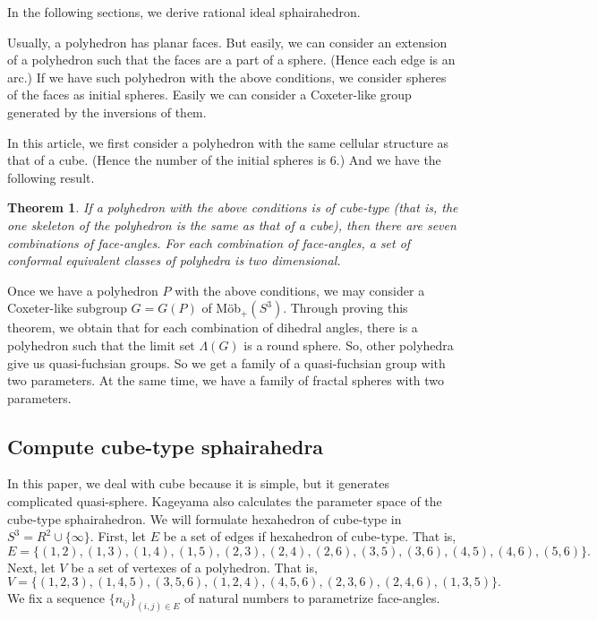 \documentclass[suppldata, dvipdfmx]{interact}
\theoremstyle{plain}%
\newtheorem{theorem}{Theorem}[section]
\theoremstyle{definition}
\theoremstyle{remark}
\theoremstyle{problemstyle}
\begin{document}
In the following sections, we derive rational ideal sphairahedron.

Usually, a polyhedron has planar faces. But easily, we can consider an
extension of a polyhedron such that the faces are a part of a
sphere. (Hence each edge is an arc.) If we have such polyhedron with
the above conditions, we consider spheres of the faces as initial
spheres. Easily we can consider a Coxeter-like group generated by the
inversions of them.

In this article, we first consider a polyhedron with the same cellular
structure as that of a cube. (Hence the number of the initial spheres is
6.) And we have the following result.

\begin{theorem}\label{main}
 If a polyhedron with the above conditions is of cube-type (that is,
 the one skeleton of the polyhedron is the same as that of a cube), then
 there are seven combinations of face-angles. For each combination of
 face-angles, a set of conformal equivalent classes of polyhedra is two
 dimensional.
\end{theorem}

Once we have a polyhedron $P$ with the above conditions, we may consider
a Coxeter-like subgroup $G=G(P)$ of M\"ob$_+(S^3)$. Through proving this
theorem, we obtain that for each combination of dihedral angles, there is a
polyhedron such that the limit set $\Lambda(G)$ is a round sphere. So,
other polyhedra give us quasi-fuchsian groups. So we get a family of
a quasi-fuchsian group with two parameters. At the same time, we have a
family of fractal spheres with two parameters.


\subsection{Compute cube-type sphairahedra}
In this paper, we deal with cube because it is simple, but it generates
complicated quasi-sphere.
Kageyama also calculates the parameter space of the cube-type
sphairahedron\cite{kageyama}.
We will formulate hexahedron of cube-type in $S^3 = R^2 \cup \{\infty\}$.
First, let $E$ be a set of edges if hexahedron of cube-type. That is,
$$
E = \{(1, 2), (1, 3), (1, 4), (1, 5), (2, 3), (2, 4), (2, 6), (3, 5),
(3, 6), (4, 5), (4, 6), (5, 6)\}.
$$
Next, let $V$ be a set of vertexes of a polyhedron. That is,
$$
V = \{(1, 2, 3), (1, 4, 5), (3, 5, 6), (1, 2, 4), (4, 5, 6), (2, 3, 6),
(2, 4, 6), (1, 3, 5)\}.
$$
We fix a sequence $\{n_{ij}\}_{(i,j) \in E}$ of natural numbers to
parametrize face-angles.
\end{document}
